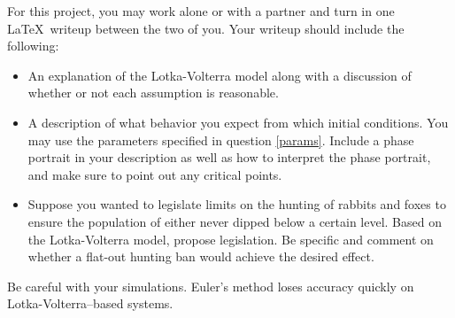 \documentclass[letter]{article}
\begin{document}
	For this project, you may work alone or with a partner and turn in one \LaTeX\ 
	writeup between the two of you.  
	Your writeup should include the following:
	\begin{itemize}
		\item An explanation of the Lotka-Volterra model along with a discussion of
			whether or not each assumption is reasonable.
		\item A description of what behavior you expect from which initial conditions.  You may use
			the parameters specified in question \ref{params}.  Include a phase portrait in
			your description as well as how to interpret the phase portrait, and make sure to point
			out any critical points.
		\item Suppose you wanted to legislate limits on the hunting of rabbits and foxes to ensure the population of either
			never dipped below a certain level.  Based on the Lotka-Volterra model, propose
			legislation.  Be specific and comment on whether a flat-out hunting ban
			would achieve the desired effect.
	\end{itemize}


	Be careful with your simulations.  Euler's method loses accuracy quickly on Lotka-Volterra--based systems.
\end{document}
